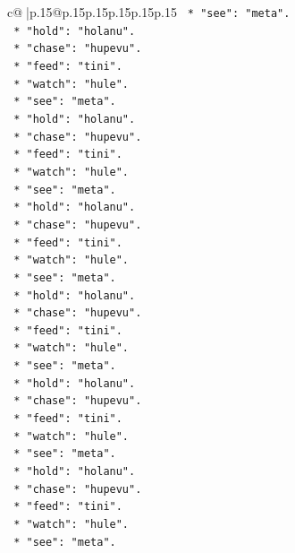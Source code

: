 \documentclass{article}
\begin{document}
{\begin{supertabular}{c@{$\;$}|p{.15\linewidth}@{}p{.15\linewidth}p{.15\linewidth}p{.15\linewidth}p{.15\linewidth}p{.15\linewidth}}
{{{\texttt{            *   "see": "meta".} \\
\texttt{            *   "hold": "holanu".} \\
\texttt{            *   "chase": "hupevu".} \\
\texttt{            *   "feed": "tini".} \\
\texttt{            *   "watch": "hule".} \\
\texttt{            *   "see": "meta".} \\
\texttt{            *   "hold": "holanu".} \\
\texttt{            *   "chase": "hupevu".} \\
\texttt{            *   "feed": "tini".} \\
\texttt{            *   "watch": "hule".} \\
\texttt{            *   "see": "meta".} \\
\texttt{            *   "hold": "holanu".} \\
\texttt{            *   "chase": "hupevu".} \\
\texttt{            *   "feed": "tini".} \\
\texttt{            *   "watch": "hule".} \\
\texttt{            *   "see": "meta".} \\
\texttt{            *   "hold": "holanu".} \\
\texttt{            *   "chase": "hupevu".} \\
\texttt{            *   "feed": "tini".} \\
\texttt{            *   "watch": "hule".} \\
\texttt{            *   "see": "meta".} \\
\texttt{            *   "hold": "holanu".} \\
\texttt{            *   "chase": "hupevu".} \\
\texttt{            *   "feed": "tini".} \\
\texttt{            *   "watch": "hule".} \\
\texttt{            *   "see": "meta".} \\
\texttt{            *   "hold": "holanu".} \\
\texttt{            *   "chase": "hupevu".} \\
\texttt{            *   "feed": "tini".} \\
\texttt{            *   "watch": "hule".} \\
\texttt{            *   "see": "meta".} \\
}}}
\end{supertabular}}
\end{document}
